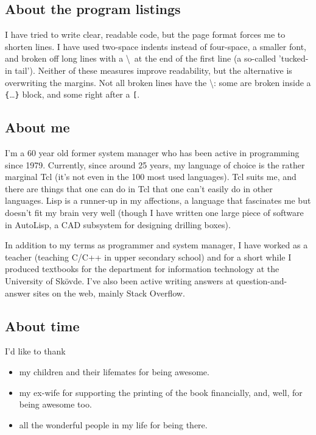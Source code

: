 \documentclass[twoside,9pt]{report}
\begin{document}
\subsection{About the program listings}
\label{about-the-program-listings}

I have tried to write clear, readable code, but the page format forces me to
shorten lines. I have used two-space indents instead of four-space, a smaller
font, and broken off long lines with a \textbackslash\  at the end of the first
line (a so-called 'tucked-in tail'). Neither of these measures improve
readability, but the alternative is overwriting the margins. Not all broken
lines have the \textbackslash: some are broken inside a
\texttt{\{}\ldots\texttt{\}} block, and some right after a \texttt{^^5b}.

\subsection{About me}
\label{about-me}

I'm a 60 year old former system manager who has been active in programming
since 1979. Currently, since around 25 years, my language of choice is the
rather marginal Tcl (it's not even in the 100 most used languages). Tcl suits
me, and there are things that one can do in Tcl that one can't easily do in
other languages. Lisp is a runner-up in my affections, a language that
fascinates me but doesn't fit my brain very well (though I have written one
large piece of software in AutoLisp, a CAD subsystem for designing drilling
boxes).

In addition to my terms as programmer and system manager, I have worked as a
teacher (teaching C/C++ in upper secondary school) and for a short while I
produced textbooks for the department for information technology at
the University of Skövde. I've also been active writing answers at
question-and-answer sites on the web, mainly Stack Overflow.

\subsection{About time}
\label{about-time}

I'd like to thank

\begin{itemize}
\item my children and their lifemates for being awesome.

\item my ex-wife for supporting the printing of the book financially, and, well, for being awesome too.

\item all the wonderful people in my life for being there.
\end{itemize}
\end{document}
